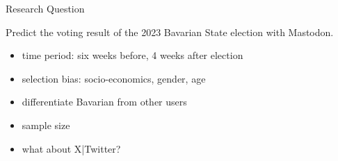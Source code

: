 
\begin{frame}{Research Question}
	
	Predict the voting result of the 2023 Bavarian State election with Mastodon.
	
	\begin{itemize}
		\item time period: six weeks before, 4 weeks after election
		\item selection bias: socio-economics, gender, age
		\item differentiate Bavarian from other users
		\item sample size
		\item what about X|Twitter?
	\end{itemize}
	
\end{frame}

